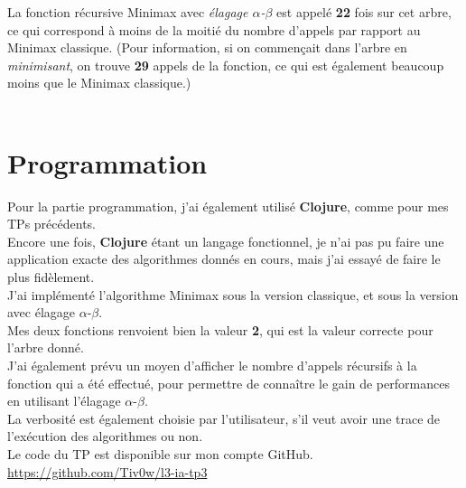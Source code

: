 \documentclass[11pt]{article}
\begin{document}
La fonction récursive Minimax avec \emph{élagage \(\alpha\)-\(\beta\)} est appelé \textbf{22} fois sur cet arbre, ce qui correspond à moins de la moitié du nombre d'appels par rapport au Minimax classique. (Pour information, si on commençait dans l'arbre en \emph{minimisant}, on trouve \textbf{29} appels de la fonction, ce qui est également beaucoup moins que le Minimax classique.)\\

\pagebreak\\
\section{Programmation}
\label{sec:org7fffcd1}
Pour la partie programmation, j'ai également utilisé \textbf{Clojure}, comme pour mes TPs précédents.\\

Encore une fois, \textbf{Clojure} étant un langage fonctionnel, je n'ai pas pu faire une application exacte des algorithmes donnés en cours, mais j'ai essayé de faire le plus fidèlement.\\
J'ai implémenté l'algorithme Minimax sous la version classique, et sous la version avec élagage \(\alpha\)-\(\beta\).\\

Mes deux fonctions renvoient bien la valeur \textbf{2}, qui est la valeur correcte pour l'arbre donné.\\
J'ai également prévu un moyen d'afficher le nombre d'appels récursifs à la fonction qui a été effectué, pour permettre de connaître le gain de performances en utilisant l'élagage \(\alpha\)-\(\beta\).\\

La verbosité est également choisie par l'utilisateur, s'il veut avoir une trace de l'exécution des algorithmes ou non.\\

Le code du TP est disponible sur mon compte GitHub.\\

\url{https://github.com/Tiv0w/l3-ia-tp3}\\
\end{document}
